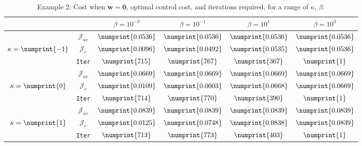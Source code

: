 \begin{table}
\begin{tabular}{ | c | c || c | c | c | c ||}
\hline
\multicolumn{2}{|c||}{}& $\beta = 10^{-3}$ & $\beta = 10^{-1}$ & $\beta = 10^{1}$ & $\beta = 10^{3}$  \\
\hline
\hline
 & $\mathcal{J}_{uc}$ & $\numprint{0.0536}$ & $\numprint{0.0536}$ & $\numprint{0.0536}$ & $\numprint{0.0536}$ \\
$\kappa= \numprint{-1}$  & $\mathcal{J}_c$ & $\numprint{0.0096}$ & $\numprint{0.0492}$ & $\numprint{0.0535}$ & $\numprint{0.0536}$ \\
& \texttt{Iter} & $\numprint{715}$ & $\numprint{767}$ & $\numprint{367}$ & $\numprint{1}$ \\
\hline
 & $\mathcal{J}_{uc}$ & $\numprint{0.0669}$ & $\numprint{0.0669}$ & $\numprint{0.0669}$ & $\numprint{0.0669}$ \\
$\kappa= \numprint{0}$  & $\mathcal{J}_c$ & $\numprint{0.0109}$ & $\numprint{0.0603}$ & $\numprint{0.0668}$ & $\numprint{0.0669}$ \\
& \texttt{Iter} & $\numprint{714}$ & $\numprint{770}$ & $\numprint{390}$ & $\numprint{1}$ \\
\hline
 & $\mathcal{J}_{uc}$ & $\numprint{0.0839}$ & $\numprint{0.0839}$ & $\numprint{0.0839}$ & $\numprint{0.0839}$ \\
$\kappa= \numprint{1}$  & $\mathcal{J}_c$ & $\numprint{0.0125}$ & $\numprint{0.0748}$ & $\numprint{0.0838}$ & $\numprint{0.0839}$ \\
& \texttt{Iter} & $\numprint{713}$ & $\numprint{773}$ & $\numprint{403}$ & $\numprint{1}$ \\
\hline
\end{tabular}
\caption{Example 2: Cost when $\mathbf{w}=\mathbf{0}$, optimal control cost, and iterations required, for a range of $\kappa$, $\beta$.}
\label{TabS5:Prob2}
\end{table}